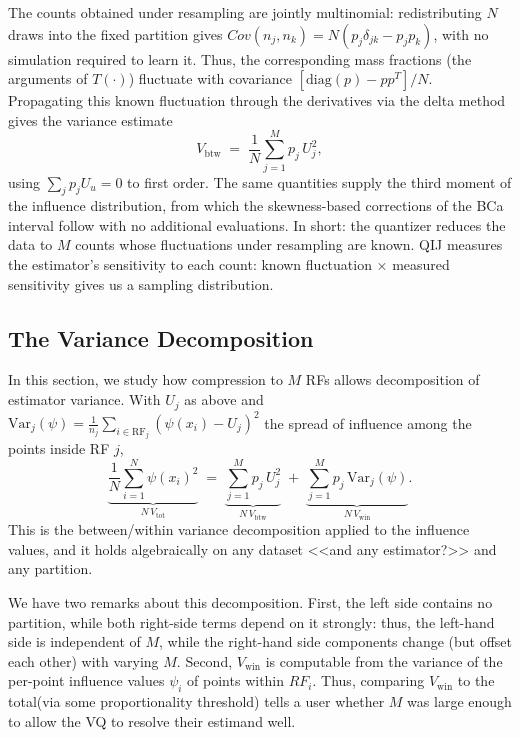 \documentclass[runningheads]{llncs}
\newcommand{\ifl}{\psi}
\newcommand{\Vcell}{V_{\mathrm{btw}}}
\newcommand{\Vwithin}{V_{\mathrm{win}}}
\newcommand{\Vtotal}{V_{\mathrm{tot}}}
\begin{document}
The counts obtained under resampling are jointly multinomial: redistributing $N$ draws into the fixed partition gives $Cov(n_j, n_k) = N(p_j \delta_{jk} - p_j p_k)$, with no simulation required to learn it. Thus, the corresponding mass fractions (the arguments of $T(\cdot)$) fluctuate with covariance $[ \text{diag}(p) - pp^T ] / N$. Propagating this known fluctuation through the derivatives via the delta method gives the variance estimate $$\Vcell \;=\; \frac1N \sum_{j=1}^{M} p_j\, U_j^{2}, \tag{3}$$ using $\sum_j p_j U_u = 0$ to first order. The same quantities supply the third moment of the influence distribution, from which the skewness-based corrections of the BCa interval \cite{efron1987} follow with no additional evaluations. In short: the quantizer reduces the data to $M$ counts whose fluctuations under resampling are known. QIJ measures the estimator's sensitivity to each count: known fluctuation × measured sensitivity gives us a sampling distribution.

\subsection{The Variance Decomposition}\label{sec:identity}

In this section, we study how compression to $M$ RFs allows decomposition of estimator variance.  With $U_j$ as above and $\mathrm{Var}_j(\ifl) = \tfrac{1}{n_j}\sum_{i \in \mathrm{RF}_j}(\ifl(x_i) - U_j)^2$ the spread of influence among the points inside RF $j$,
\begin{equation}\label{eq:identity}
\underbrace{\frac1N\sum_{i=1}^{N} \ifl(x_i)^{2}}_{N\,\Vtotal}
\;=\;
\underbrace{\sum_{j=1}^{M} p_j\, U_j^{2}}_{N\,\Vcell}
\;+\;
\underbrace{\sum_{j=1}^{M} p_j\, \mathrm{Var}_j(\ifl)}_{N\,\Vwithin}.
\end{equation}
This is the between/within variance decomposition applied to the influence values, and it holds algebraically on any dataset <<and any estimator?>> and any partition. 

We have two remarks about this decomposition. First, the left side contains no partition, while both right-side terms depend on it strongly: thus, the left-hand side is independent of $M$, while the right-hand side components change (but offset each other) with varying $M$. Second, $\Vwithin$ is computable from the variance of the per-point influence values $\psi_i$ of points within $RF_i$. Thus, comparing $\Vwithin$ to the total(via some proportionality threshold) tells a user whether $M$ was large enough to allow the VQ to resolve their estimand well. 
\end{document}
